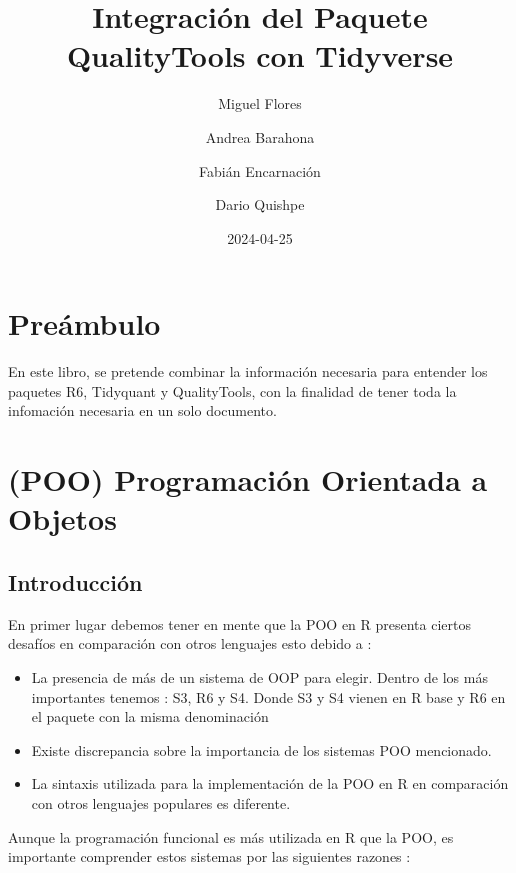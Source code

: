 \documentclass[
]{book}
\title{Integración del Paquete QualityTools con Tidyverse}
\author{Miguel Flores \and Andrea Barahona \and Fabián Encarnación \and Dario Quishpe}
\date{2024-04-25}
\begin{document}
\maketitle

{
\setcounter{tocdepth}{1}
\tableofcontents
}
\hypertarget{preuxe1mbulo}{%
\chapter{Preámbulo}\label{preuxe1mbulo}}

En este libro, se pretende combinar la información necesaria para entender los paquetes R6, Tidyquant y QualityTools, con la finalidad de tener toda la infomación necesaria en un solo documento.

\hypertarget{poo-programaciuxf3n-orientada-a-objetos}{%
\chapter{(POO) Programación Orientada a Objetos}\label{poo-programaciuxf3n-orientada-a-objetos}}

\hypertarget{introducciuxf3n}{%
\section{Introducción}\label{introducciuxf3n}}

En primer lugar debemos tener en mente que la POO en R presenta ciertos desafíos en comparación con otros lenguajes esto debido a :

\begin{itemize}
\item
  La presencia de más de un sistema de OOP para elegir. Dentro de los más importantes tenemos : S3, R6 y S4. Donde S3 y S4 vienen en R base y R6 en el paquete con la misma denominación
\item
  Existe discrepancia sobre la importancia de los sistemas POO mencionado.
\item
  La sintaxis utilizada para la implementación de la POO en R en comparación con otros lenguajes populares es diferente.
\end{itemize}

Aunque la programación funcional es más utilizada en R que la POO, es importante comprender estos sistemas por las siguientes razones :
\end{document}
